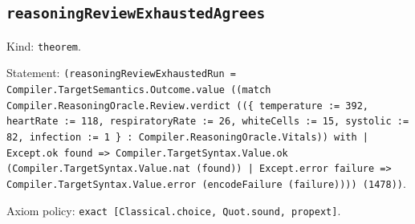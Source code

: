 \documentclass[11pt]{article}
\begin{document}
\subsection*{\texttt{reasoningReviewExhaustedAgrees}}
\noindent Kind: \texttt{theorem}.\par
\noindent Statement: \texttt{(reasoningReviewExhaustedRun = Compiler.TargetSemantics.Outcome.value ((match Compiler.ReasoningOracle.Review.verdict ((\{ temperature := 392, heartRate := 118, respiratoryRate := 26, whiteCells := 15, systolic := 82, infection := 1 \} : Compiler.ReasoningOracle.Vitals)) with | Except.ok found => Compiler.TargetSyntax.Value.ok (Compiler.TargetSyntax.Value.nat (found)) | Except.error failure => Compiler.TargetSyntax.Value.error (encodeFailure (failure)))) (1478))}.\par
\noindent Axiom policy: \texttt{exact [Classical.choice, Quot.sound, propext]}.\par
\end{document}
